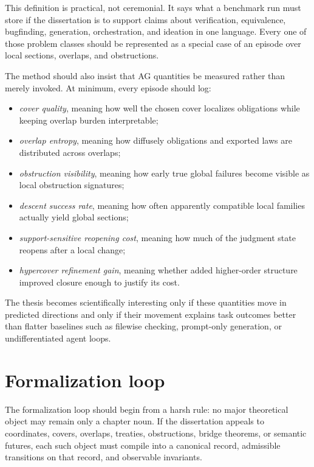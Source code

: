 \documentclass[11pt]{report}
\begin{document}
This definition is practical, not ceremonial. It says what a benchmark run must store if the dissertation is to support claims about verification, equivalence, bugfinding, generation, orchestration, and ideation in one language. Every one of those problem classes should be represented as a special case of an episode over local sections, overlaps, and obstructions.

The method should also insist that AG quantities be measured rather than merely invoked. At minimum, every episode should log:
\begin{itemize}
\item \emph{cover quality}, meaning how well the chosen cover localizes obligations while keeping overlap burden interpretable;
\item \emph{overlap entropy}, meaning how diffusely obligations and exported laws are distributed across overlaps;
\item \emph{obstruction visibility}, meaning how early true global failures become visible as local obstruction signatures;
\item \emph{descent success rate}, meaning how often apparently compatible local families actually yield global sections;
\item \emph{support-sensitive reopening cost}, meaning how much of the judgment state reopens after a local change;
\item \emph{hypercover refinement gain}, meaning whether added higher-order structure improved closure enough to justify its cost.
\end{itemize}

The thesis becomes scientifically interesting only if these quantities move in predicted directions and only if their movement explains task outcomes better than flatter baselines such as filewise checking, prompt-only generation, or undifferentiated agent loops.

\section{Formalization loop}
The formalization loop should begin from a harsh rule: no major theoretical object may remain only a chapter noun. If the dissertation appeals to coordinates, covers, overlaps, treaties, obstructions, bridge theorems, or semantic futures, each such object must compile into a canonical record, admissible transitions on that record, and observable invariants.
\end{document}
